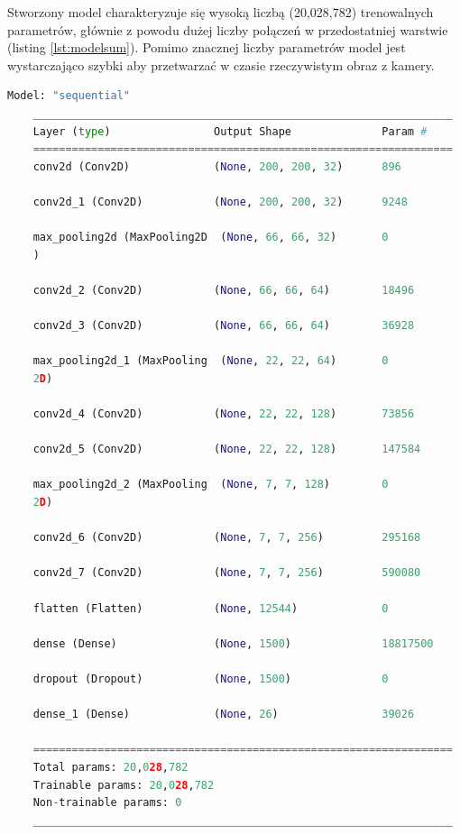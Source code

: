 \documentclass[a4paper,12pt,oneside]{book} %
\begin{document}
Stworzony model charakteryzuje się wysoką liczbą (20,028,782) trenowalnych parametrów, głównie z powodu dużej liczby połączeń w przedostatniej warstwie (listing \ref{lst:modelsum}). Pomimo znacznej liczby parametrów model jest wystarczająco szybki aby przetwarzać w czasie rzeczywistym obraz z kamery.

\begin{lstlisting}[language=Python, caption={Podsumowanie modelu}, label={lst:modelsum}]
	Model: "sequential"
	_________________________________________________________________
	Layer (type)                Output Shape              Param #   
	=================================================================
	conv2d (Conv2D)             (None, 200, 200, 32)      896       
	
	conv2d_1 (Conv2D)           (None, 200, 200, 32)      9248      
	
	max_pooling2d (MaxPooling2D  (None, 66, 66, 32)       0         
	)                                                               
	
	conv2d_2 (Conv2D)           (None, 66, 66, 64)        18496     
	
	conv2d_3 (Conv2D)           (None, 66, 66, 64)        36928     
	
	max_pooling2d_1 (MaxPooling  (None, 22, 22, 64)       0         
	2D)                                                             
	
	conv2d_4 (Conv2D)           (None, 22, 22, 128)       73856     
	
	conv2d_5 (Conv2D)           (None, 22, 22, 128)       147584    
	
	max_pooling2d_2 (MaxPooling  (None, 7, 7, 128)        0         
	2D)                                                             
	
	conv2d_6 (Conv2D)           (None, 7, 7, 256)         295168    
	
	conv2d_7 (Conv2D)           (None, 7, 7, 256)         590080    
	
	flatten (Flatten)           (None, 12544)             0         
	
	dense (Dense)               (None, 1500)              18817500  
	
	dropout (Dropout)           (None, 1500)              0         
	
	dense_1 (Dense)             (None, 26)                39026     
	
	=================================================================
	Total params: 20,028,782
	Trainable params: 20,028,782
	Non-trainable params: 0
	_________________________________________________________________
	
\end{lstlisting}
\end{document}
